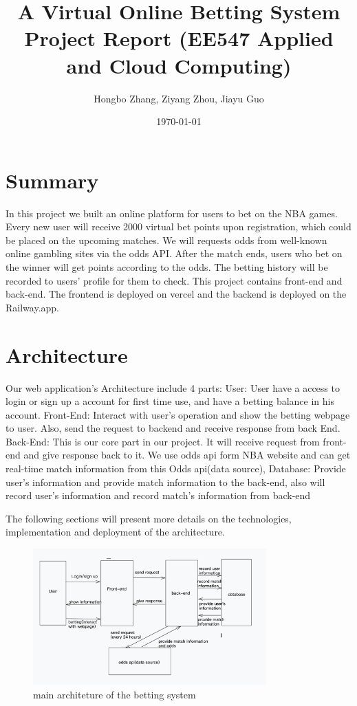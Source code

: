 \documentclass[singlecolumn]{article}
\begin{document}
\title{A Virtual Online Betting System\\
\large Project Report (EE547 Applied and Cloud Computing)}
\author{Hongbo Zhang, Ziyang Zhou, Jiayu Guo}
\date{\today}
\maketitle


\section{Summary}

In this project we built an online platform for users to bet on the NBA games. Every new user will receive 2000 virtual bet points upon registration, which could be placed on the upcoming matches. We will requests odds from well-known online gambling sites via the odds API. After the match ends, users who bet on the winner will get points according to the odds. The betting history will be recorded to users’ profile for them to check. This project contains front-end and back-end. The frontend is deployed on vercel and the backend is deployed on the Railway.app.


\section{Architecture}

Our web application's Architecture include 4 parts:
User: User have a access to login or sign up a account for first time use, and have a betting balance in his account.
Front-End: Interact with user's operation and show the betting webpage to user. Also, send the request to backend and receive response from back End.
Back-End: This is our core part in our project. It will receive request from front-end and give response back to it. We use odds api form NBA website and can get real-time match information from this Odds api(data source), 
Database: Provide user's information and provide match information to the back-end, also will record user's information and record match's information from back-end

The following sections will present more details on the technologies, implementation and deployment of the architecture.

\begin{figure}[H]
    \centering
    \includegraphics[width=0.8\textwidth]{architecture.png}
    \caption{main architeture of the betting system}
    \label{fig:architecture}
\end{figure}
\end{document}
